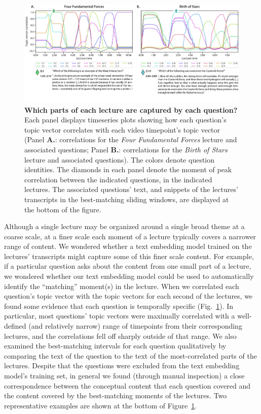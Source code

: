 \documentclass[10pt]{article}
\begin{document}
\begin{figure}[tp]
    \centering
    \includegraphics[width=\textwidth]{figs/lecture-question-similarity}

    \caption{\textbf{Which parts of each lecture are captured by each
    question?} Each panel displays timeseries plots showing how each question's
    topic vector correlates with each video timepoint's topic vector (Panel
    \textbf{A.}: correlations for the \textit{Four Fundamental Forces} lecture
    and associated questions; Panel \textbf{B.}: correlations for the
    \textit{Birth of Stars} lecture and associated questions). The colors denote
    question identities. The diamonds in each panel denote the moment of peak
    correlation between the indicated questions, in the indicated lectures. The
    associated questions' text, and snippets of the lectures' transcripts in
    the best-matching sliding windows, are displayed at the bottom of the
    figure.}

    \label{fig:question-correlations}
\end{figure}

Although a single lecture may be organized around a single broad theme at a
coarse scale, at a finer scale each moment of a lecture typically covers a
narrower range of content. We wondered whether a text embedding model trained
on the lectures' transcripts might capture some of this finer scale content.
For example, if a particular question asks about the content from one small
part of a lecture, we wondered whether our text embedding model could be used
to automatically identify the ``matching'' moment(s) in the lecture. When we
correlated each question's topic vector with the topic vectors for each second
of the lectures, we found some evidence that each question is temporally
specific (Fig.~\ref{fig:question-correlations}). In particular, most questions'
topic vectors were maximally correlated with a well-defined (and relatively
narrow) range of timepoints from their corresponding lectures, and the
correlations fell off sharply outside of that range. We also examined the
best-matching intervals for each question qualitatively by comparing the text
of the question to the text of the most-correlated parts of the lectures.
Despite that the questions were excluded from the text embedding model's
training set, in general we found (through manual inspection) a close
correspondence between the conceptual content that each question covered and
the content covered by the best-matching moments of the lectures. Two
representative examples are shown at the bottom of
Figure~\ref{fig:question-correlations}.
\end{document}
